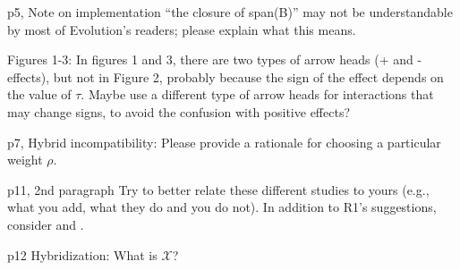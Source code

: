 
\begin{point}{p5, Note on implementation}
    ``the closure of span(B)'' may not be
    understandable by most of Evolution's readers; please explain what this means.
\end{point}


\begin{point}{Figures 1-3:}
    In figures 1 and 3, there are two types of arrow heads (+ and -
effects), but not in Figure 2, probably because the sign of the effect depends
on the value of $\tau$. Maybe use a  different type of arrow heads for
interactions that may change signs, to avoid the confusion with positive
effects?
\end{point}


\begin{point}{p7, Hybrid incompatibility:}
    Please provide a rationale for choosing a particular weight $\rho$.
\end{point}


\begin{point}{p11, 2nd paragraph}
    Try to better relate these different studies to yours
(e.g., what you add, what they do and you do not). In addition to R1's
suggestions, consider \citet{weinreich2013fishers} and \citet{blanquart2016epistasis}.
\end{point}


\begin{point}{p12 Hybridization:}
    What is $\mathcal{X}$?
\end{point}

